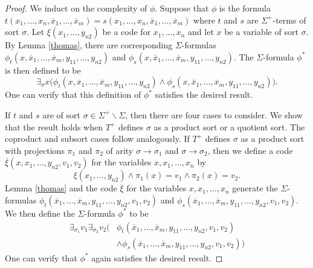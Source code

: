 \begin{proof} We induct on the complexity of $\phi$. Suppose that
  $\phi$ is the formula
  $t(x_1,\ldots, x_n, \overline{x}_1,\ldots,
  \overline{x}_m)=s(x_1,\ldots, x_n,
  \overline{x}_1,\ldots,\overline{x}_m)$ where $t$ and $s$ are
  $\Sigma^+$-terms of sort $\sigma$.  Let $\xi(x_1,\ldots, y_{n2})$ be
  a code for $x_1,\ldots, x_n$ and let $x$ be a variable of sort
  $\sigma$.  By Lemma \ref{thomas}, there are corresponding
  $\Sigma$-formulas
  $\phi_t(x,\overline{x}_1,\ldots, \overline{x}_m, y_{11}, \ldots,
  y_{n2})$ and
  $\phi_s(x,\overline{x}_1,\ldots, \overline{x}_m, y_{11}, \ldots,
  y_{n2})$.  The $\Sigma$-formula $\phi^*$ is then defined to be
\[ 
  \exists_\sigma x\big(\phi_t(x,\overline{x}_1,\ldots, \overline{x}_m,
  y_{11}, \ldots, y_{n2})\land\phi_s(x,\overline{x}_1,\ldots,
  \overline{x}_m, y_{11}, \ldots, y_{n2})\big) . \] One can verify
that this definition of $\phi^*$ satisfies the desired result.

If $t$ and $s$ are of sort $\sigma\in\Sigma^+\backslash\Sigma$, then
there are four cases to consider. We show that the result holds when
$T^+$ defines $\sigma$ as a product sort or a quotient sort. The
coproduct and subsort cases follow analogously. If $T^+$ defines
$\sigma$ as a product sort with projections $\pi_1$ and $\pi_2$ of
arity $\sigma\rightarrow\sigma_1$ and $\sigma\rightarrow\sigma_2$,
then we define a code
$\overline{\xi}(x, x_1,\ldots, y_{n2}, v_1, v_2)$ for the variables
$x, x_1,\ldots, x_n$ by
\[ \xi(x_1,\ldots, y_{n2})\land\pi_1(x)=v_1\land\pi_2(x)=v_2 .\] Lemma
\ref{thomas} and the code $\overline{\xi}$ for the variables
$x,x_1,\ldots, x_n$ generate the $\Sigma$-formulas
$\phi_t(\overline{x}_1,\ldots, \overline{x}_m, y_{11}, \ldots, y_{n2},
v_1, v_2)$ and
$\phi_s(\overline{x}_1,\ldots, \overline{x}_m, y_{11}, \ldots, y_{n2},
v_1, v_2)$. We then define the $\Sigma$-formula $\phi^*$ to be
\begin{align*}
\exists_{\sigma_1}v_1\exists_{\sigma_2}v_2\big(&\phi_t(\overline{x}_1,\ldots, \overline{x}_m, y_{11}, \ldots, y_{n2}, v_1, v_2)\\ 
&\land \phi_s(\overline{x}_1,\ldots, \overline{x}_m, y_{11}, \ldots, y_{n2}, v_1, v_2)\big)
\end{align*}
One can verify that $\phi^*$ again satisfies the desired result. 


\end{proof}
